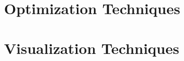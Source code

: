 %
%
%
%

\setlength{\footskip}{8mm}

\chapter{Optimization Techniques} 
\label{optimization-techniques}





%
%
%
%

\setlength{\footskip}{8mm}

\chapter{Visualization Techniques} 
\label{visualization-techniques}





%
%
%
%

\setlength{\footskip}{8mm}

